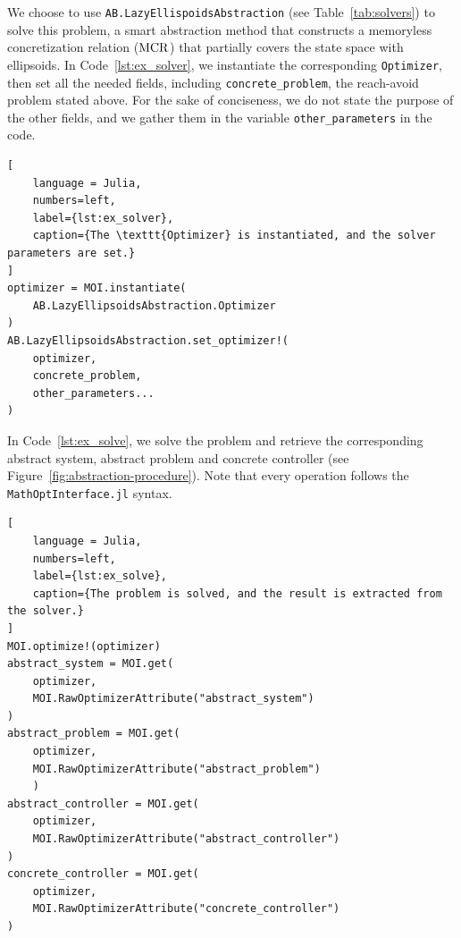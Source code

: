 \documentclass{juliacon}
\begin{document}
We choose to use \texttt{AB.LazyEllispoidsAbstraction} (see Table~\ref{tab:solvers}) to solve this problem, a smart abstraction method that constructs a memoryless concretization relation ($\operatorname{MCR}$) that partially covers the state space with ellipsoids. In Code~\ref{lst:ex_solver}, we instantiate the corresponding \texttt{Optimizer}, then set all the needed fields, including \texttt{concrete\_problem}, the reach-avoid problem stated above. For the sake of conciseness, we do not state the purpose of the other fields, and we gather them in the variable \texttt{other\_parameters} in the code.
\begin{lstlisting}[
    language = Julia, 
    numbers=left, 
    label={lst:ex_solver}, 
    caption={The \texttt{Optimizer} is instantiated, and the solver parameters are set.}
]
optimizer = MOI.instantiate(
    AB.LazyEllipsoidsAbstraction.Optimizer
)
AB.LazyEllipsoidsAbstraction.set_optimizer!(
    optimizer,
    concrete_problem,
    other_parameters...
)
\end{lstlisting}

In Code~\ref{lst:ex_solve}, we solve the problem and retrieve the corresponding abstract system, abstract problem and concrete controller (see Figure~\ref{fig:abstraction-procedure}). Note that every operation follows the \texttt{MathOptInterface.jl} syntax.
\begin{lstlisting}[
    language = Julia, 
    numbers=left, 
    label={lst:ex_solve}, 
    caption={The problem is solved, and the result is extracted from the solver.}
]
MOI.optimize!(optimizer)
abstract_system = MOI.get(
    optimizer, 
    MOI.RawOptimizerAttribute("abstract_system")
)
abstract_problem = MOI.get(
    optimizer, 
    MOI.RawOptimizerAttribute("abstract_problem")
    )
abstract_controller = MOI.get(
    optimizer, 
    MOI.RawOptimizerAttribute("abstract_controller")
)
concrete_controller = MOI.get(
    optimizer, 
    MOI.RawOptimizerAttribute("concrete_controller")
)
\end{lstlisting}
\end{document}
